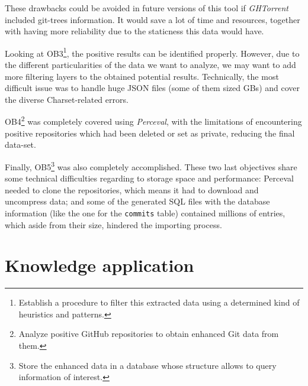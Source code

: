 \documentclass[a4paper, 12pt]{book}
\begin{document}
These drawbacks could be avoided in future versions of this tool if \emph{GHTorrent} included git-trees information. It would save a lot of time and resources,
together with having more reliability due to the staticness this data would have.

Looking at OB3\footnote{Establish a procedure to filter this extracted data using a determined kind of heuristics and patterns.},
the positive results can be identified properly. However, due to the different particularities of the data
we want to analyze, we may want to add more filtering layers to the obtained potential results. Technically,
the most difficult issue was to handle huge JSON files (some of them sized GBs) and cover the diverse Charset-related
errors.

OB4\footnote{Analyze positive GitHub repositories to obtain enhanced Git data from them.}
was completely covered using \emph{Perceval}, with the limitations of encountering positive repositories which had been deleted
or set as private, reducing the final data-set.

Finally, OB5\footnote{Store the enhanced data in a database whose structure allows to query information of interest.}
was also completely accomplished. These two last objectives
share some technical difficulties regarding to storage space and performance: Perceval needed to clone the repositories,
which means it had to download and uncompress data; and some of the generated SQL files with the database information
(like the one for the \texttt{commits} table) contained millions of entries, which aside from their size, hindered
the importing process.

\section{Knowledge application}
\label{sec:knowledge-application}
\end{document}
